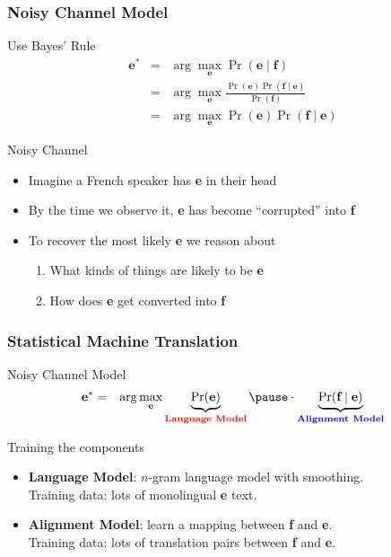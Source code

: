 \begin{frame}
\frametitle{Noisy Channel Model}
\begin{block}{Use Bayes' Rule}
\begin{eqnarray*}
\textbf{e}^\ast & = & \arg\max_{\textbf{e}} \Pr(\textbf{e} \mid \textbf{f}) \\
& = & \arg\max_{\textbf{e}} \frac{ \Pr(\textbf{e}) \Pr(\textbf{f} \mid \textbf{e}) }{ \Pr(\textbf{f}) } \\
& = & \arg\max_{\textbf{e}} \Pr(\textbf{e}) \Pr(\textbf{f} \mid \textbf{e})
\end{eqnarray*}
\end{block}\pause
\begin{block}{Noisy Channel}
\begin{itemize}
\item Imagine a French speaker has \textbf{e} in their head
\item By the time we observe it, \textbf{e} has become ``corrupted'' into \textbf{f}
\item To recover the most likely \textbf{e} we reason about 
\begin{enumerate}
\item What kinds of things are likely to be \textbf{e}
\item How does \textbf{e} get converted into \textbf{f}
\end{enumerate}
\end{itemize}
\end{block}
\end{frame}

\begin{frame}
\frametitle{Statistical Machine Translation}
\begin{block}{Noisy Channel Model}
\begin{eqnarray*}
\textbf{e}^\ast & = & \arg\max_{\textbf{e}} \underbrace{\Pr(\textbf{e})}_{\color{red}\textbf{Language Model}} \pause \cdot \underbrace{\Pr(\textbf{f} \mid \textbf{e})}_{\color{blue}\textbf{Alignment Model}}
\end{eqnarray*}
\end{block}\pause
\begin{block}{Training the components}
\begin{itemize}[<+->]
\item \color{red}\textbf{Language Model}: $n$-gram language model with smoothing. \\
Training data: lots of monolingual \textbf{e} text.
\item \color{blue}\textbf{Alignment Model}: learn a mapping between \textbf{f} and \textbf{e}. \\
Training data: lots of translation pairs between \textbf{f} and \textbf{e}.
\end{itemize}
\end{block}
\end{frame}

